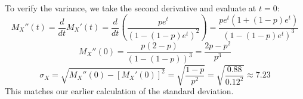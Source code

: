 \documentclass{article}
\begin{document}
To verify the variance, we take the second derivative and evaluate at \( t = 0 \):
\[
M_X''(t) = \frac{d}{dt} M_X'(t) = \frac{d}{dt} \left( \frac{pe^t}{(1-(1-p)e^t)^2} \right)  = \frac{p e^t \left( 1 + (1-p) e^t  \right)}{\left( 1 - (1-p)e^t \right)^3}
\]
\[
M_X''(0) = \frac{p(2-p)}{(1-(1-p))^3} = \frac{2p-p^2}{p^3} 
\]
\[
\sigma_X = \sqrt{M_X''(0) - [M_X'(0)]^2} = \sqrt{\frac{1-p}{p^2}} = \sqrt{\frac{0.88}{0.12^2}} \approx 7.23
\]
This matches our earlier calculation of the standard deviation.
\end{document}
